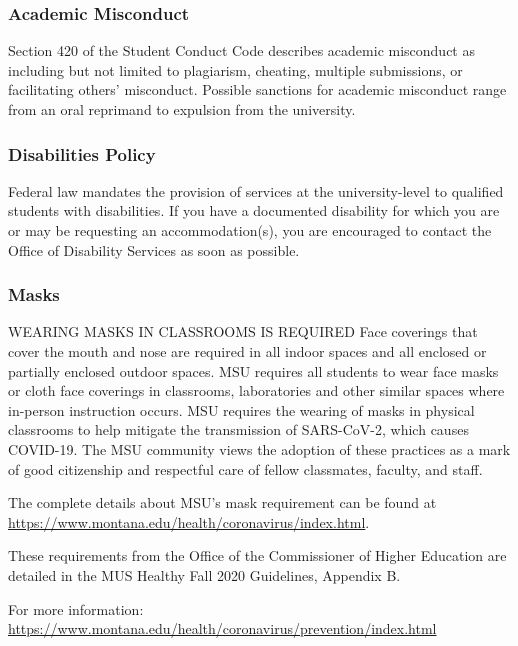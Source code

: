 \documentclass[11pt,]{article}
\begin{document}
\hypertarget{academic-misconduct}{%
\subsubsection{Academic Misconduct}\label{academic-misconduct}}

Section 420 of the Student Conduct Code describes academic misconduct as
including but not limited to plagiarism, cheating, multiple submissions,
or facilitating others' misconduct. Possible sanctions for academic
misconduct range from an oral reprimand to expulsion from the
university.

\hypertarget{disabilities-policy}{%
\subsubsection{Disabilities Policy}\label{disabilities-policy}}

Federal law mandates the provision of services at the university-level
to qualified students with disabilities. If you have a documented
disability for which you are or may be requesting an accommodation(s),
you are encouraged to contact the Office of Disability Services as soon
as possible.

\hypertarget{masks}{%
\subsubsection{Masks}\label{masks}}

WEARING MASKS IN CLASSROOMS IS REQUIRED Face coverings that cover the
mouth and nose are required in all indoor spaces and all enclosed or
partially enclosed outdoor spaces. MSU requires all students to wear
face masks or cloth face coverings in classrooms, laboratories and other
similar spaces where in-person instruction occurs. MSU requires the
wearing of masks in physical classrooms to help mitigate the
transmission of SARS-CoV-2, which causes COVID-19. The MSU community
views the adoption of these practices as a mark of good citizenship and
respectful care of fellow classmates, faculty, and staff.

The complete details about MSU's mask requirement can be found at
\url{https://www.montana.edu/health/coronavirus/index.html}.

These requirements from the Office of the Commissioner of Higher
Education are detailed in the MUS Healthy Fall 2020 Guidelines, Appendix
B.

For more information:
\url{https://www.montana.edu/health/coronavirus/prevention/index.html}
\end{document}
